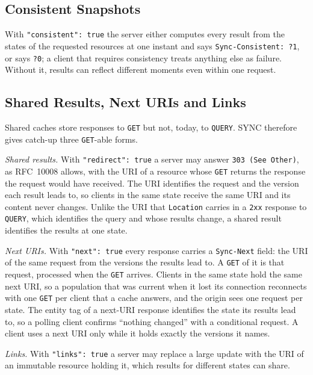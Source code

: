 \documentclass[11pt,a4paper]{article}
\begin{document}
\subsection{Consistent Snapshots}
\label{sec:consistency}

With \texttt{"consistent": true} the server either computes every result from the states of the requested resources at one instant and says \texttt{Sync-Consistent: ?1}, or says \texttt{?0}; a client that requires consistency treats anything else as failure. Without it, results can reflect different moments even within one request.

\subsection{Shared Results, Next URIs and Links}
\label{sec:sharing}

Shared caches store responses to \texttt{GET} but not, today, to \texttt{QUERY}. SYNC therefore gives catch-up three \texttt{GET}-able forms.

\emph{Shared results.} With \texttt{"redirect": true} a server may answer \texttt{303 (See Other)}, as RFC~10008 allows, with the URI of a resource whose \texttt{GET} returns the response the request would have received. The URI identifies the request and the version each result leads to, so clients in the same state receive the same URI and its content never changes. Unlike the URI that \texttt{Location} carries in a \texttt{2xx} response to \texttt{QUERY}, which identifies the query and whose results change, a shared result identifies the results at one state.

\emph{Next URIs.} With \texttt{"next": true} every response carries a \texttt{Sync-Next} field: the URI of the same request from the versions the results lead to. A \texttt{GET} of it is that request, processed when the \texttt{GET} arrives. Clients in the same state hold the same next URI, so a population that was current when it lost its connection reconnects with one \texttt{GET} per client that a cache answers, and the origin sees one request per state. The entity tag of a next-URI response identifies the state its results lead to, so a polling client confirms ``nothing changed'' with a conditional request. A client uses a next URI only while it holds exactly the versions it names.

\emph{Links.} With \texttt{"links": true} a server may replace a large update with the URI of an immutable resource holding it, which results for different states can share.
\end{document}

